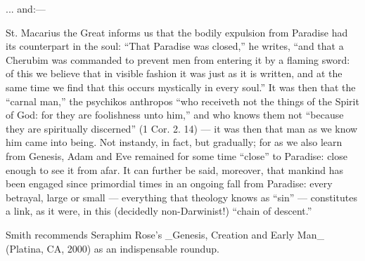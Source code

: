 \begin{footnotesize}
\begin{sffamily}
... and:---


St. Macarius the Great informs us that the bodily expulsion from Paradise had its counterpart in the soul: ``That Paradise was closed,'' he writes, ``and that a Cherubim was commanded to prevent men from entering it by a flaming sword: of this we believe that in visible fashion it was just as it is written, and at the same time we find that this occurs mystically in every soul.'' It was then that the ``carnal man,'' the psychikos anthropos ``who receiveth not the things of the Spirit of God: for they are foolishness unto him,'' and who knows them not ``because they are spiritually discerned'' (1 Cor. 2. 14) --- it was then that man as we know him came into being. Not instandy, in fact, but gradually; for as we also learn from Genesis, Adam and Eve remained for some time ``close'' to Paradise: close enough to see it from afar. It can further be said, moreover, that mankind has been engaged since primordial times in an ongoing fall from Paradise: every betrayal, large or small --- everything that theology knows as ``sin'' --- constitutes a link, as it were, in this (decidedly non-Darwinist!) ``chain of descent.''

Smith recommends Seraphim Rose's \_Genesis, Creation and Early Man\_ (Platina, CA, 2000) as an indispensable roundup.


\hfill

\end{sffamily}
\end{footnotesize}


